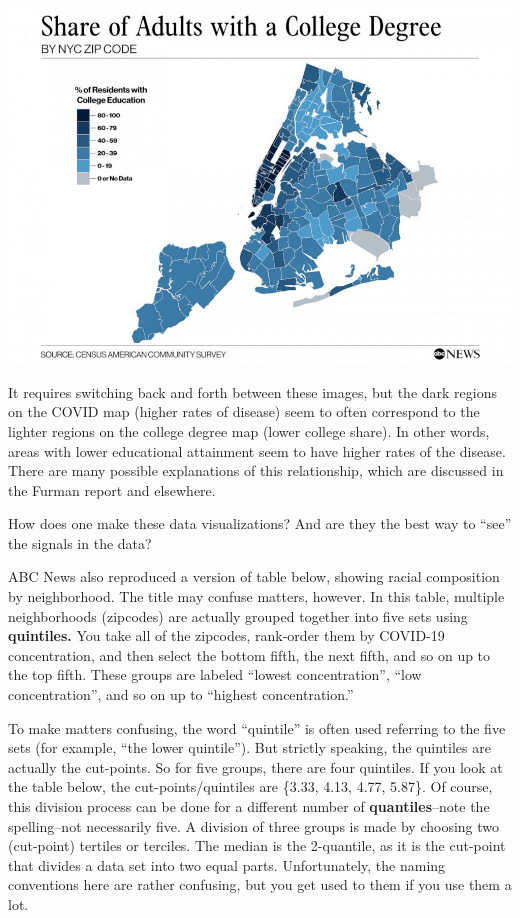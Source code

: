 \documentclass[
  openany]{book}
\begin{document}
\includegraphics{images/abc_CollegeDegreeNycZip_v02_KA_hpEmbed_17x12_992.jpg}

It requires switching back and forth between these images, but the dark regions on the COVID map (higher rates of disease) seem to often correspond to the lighter regions on the college degree map (lower college share). In other words, areas with lower educational attainment seem to have higher rates of the disease. There are many possible explanations of this relationship, which are discussed in the Furman report and elsewhere.

How does one make these data visualizations? And are they the best way to ``see'' the signals in the data?

ABC News also reproduced a version of table below, showing racial composition by neighborhood. The title may confuse matters, however. In this table, multiple neighborhoods (zipcodes) are actually grouped together into five sets using \textbf{quintiles.} You take all of the zipcodes, rank-order them by COVID-19 concentration, and then select the bottom fifth, the next fifth, and so on up to the top fifth. These groups are labeled ``lowest concentration'', ``low concentration'', and so on up to ``highest concentration.''

To make matters confusing, the word ``quintile'' is often used referring to the five sets (for example, ``the lower quintile''). But strictly speaking, the quintiles are actually the cut-points. So for five groups, there are four quintiles. If you look at the table below, the cut-points/quintiles are \{3.33, 4.13, 4.77, 5.87\}. Of course, this division process can be done for a different number of \textbf{quantiles}--note the spelling--not necessarily five. A division of three groups is made by choosing two (cut-point) tertiles or terciles. The median is the 2-quantile, as it is the cut-point that divides a data set into two equal parts. Unfortunately, the naming conventions here are rather confusing, but you get used to them if you use them a lot.
\end{document}
